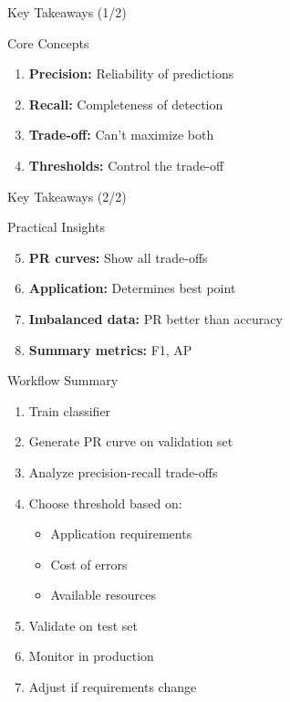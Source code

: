 \documentclass{beamer}
\begin{document}
\begin{frame}{Key Takeaways (1/2)}
\begin{keypointsbox}{Core Concepts}
\begin{enumerate}
    \item \textbf{Precision:} Reliability of predictions
    \item \textbf{Recall:} Completeness of detection
    \item \textbf{Trade-off:} Can't maximize both
    \item \textbf{Thresholds:} Control the trade-off
\end{enumerate}
\end{keypointsbox}
\end{frame}

\begin{frame}{Key Takeaways (2/2)}
\begin{keypointsbox}{Practical Insights}
\begin{enumerate}
    \setcounter{enumi}{4}
    \item \textbf{PR curves:} Show all trade-offs
    \item \textbf{Application:} Determines best point
    \item \textbf{Imbalanced data:} PR better than accuracy
    \item \textbf{Summary metrics:} F1, AP
\end{enumerate}
\end{keypointsbox}
\end{frame}

\begin{frame}{Workflow Summary}
\begin{enumerate}
    \item Train classifier
    \item Generate PR curve on validation set
    \item Analyze precision-recall trade-offs
    \item Choose threshold based on:
    \begin{itemize}
        \item Application requirements
        \item Cost of errors
        \item Available resources
    \end{itemize}
    \item Validate on test set
    \item Monitor in production
    \item Adjust if requirements change
\end{enumerate}
\end{frame}
\end{document}
